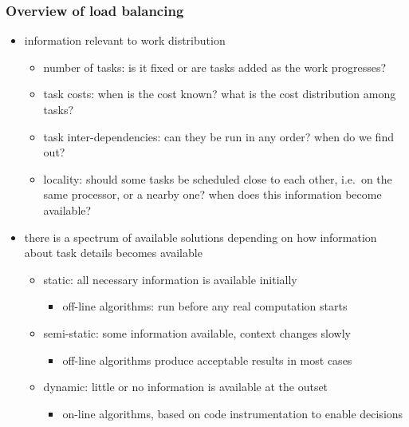 \begin{frame}[fragile]
%
  \frametitle{Overview of load balancing}
%
  \begin{itemize}
%
  \item information relevant to work distribution
    \begin{itemize}
    \item number of tasks: is it fixed or are tasks added as the work progresses?
    \item task costs: when is the cost known? what is the cost distribution among tasks?
    \item task inter-dependencies: can they be run in any order? when do we find out?
    \item locality: should some tasks be scheduled close to each other, i.e.~on the same
      processor, or a nearby one? when does this information become available?
    \end{itemize}
%
    \item there is a spectrum of available solutions depending on how information about task
      details becomes available
      \begin{itemize}
      \item static: all necessary information is available initially
        \begin{itemize}
        \item off-line algorithms: run before any real computation starts
        \end{itemize}
      \item semi-static: some information available, context changes slowly
        \begin{itemize}
        \item off-line algorithms produce acceptable results in most cases
        \end{itemize}
      \item dynamic: little or no information is available at the outset
        \begin{itemize}
        \item on-line algorithms, based on code instrumentation to enable decisions
        \end{itemize}
      \end{itemize}
%
  \end{itemize}
%
\end{frame}

